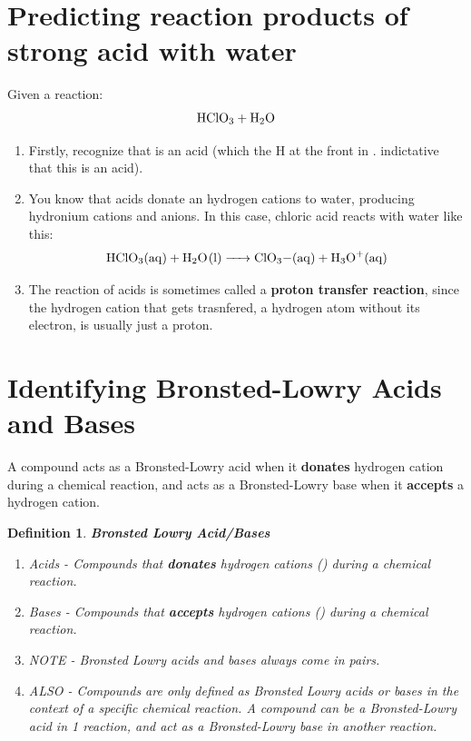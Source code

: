 \documentclass{article}  %
\newtheorem{defn}{Definition}
\begin{document}
\section*{Predicting reaction products of strong acid with water}   
Given a reaction:
\begin{equation*}
    \begin{aligned}
        \ce{HClO3 + H2O}
    \end{aligned}
\end{equation*}
\begin{enumerate}
    \item Firstly, recognize that  is an acid (which the H at the front in . indictative that this is an acid).
    \item You know that acids donate an hydrogen cations to water, producing hydronium cations  and anions. In this case, chloric acid reacts with water like this:
    \begin{equation*}
        \begin{aligned}
            \ce{HClO3_(aq) + H2O_(l) -> ClO3-_(aq) + H3O+_(aq)} 
        \end{aligned}
    \end{equation*}
    \item The reaction of acids is sometimes called a \textbf{proton transfer reaction}, since the hydrogen cation that gets trasnfered, a hydrogen atom without its electron, is usually just a proton.

\end{enumerate}

\section*{Identifying Bronsted-Lowry Acids and Bases}
A compound acts as a Bronsted-Lowry acid when it \textbf{donates} hydrogen cation during a chemical reaction, and acts as a Bronsted-Lowry base when it \textbf{accepts} a hydrogen cation.
\begin{defn}
    \textbf{Bronsted Lowry Acid/Bases} \\
    \begin{enumerate}
        \item Acids - Compounds that \textbf{donates} hydrogen cations () during a chemical reaction.
        \item Bases - Compounds that \textbf{accepts} hydrogen cations () during a chemical reaction.
        \item NOTE - Bronsted Lowry acids and bases always come in pairs.
        \item ALSO - Compounds are only defined as Bronsted Lowry acids or bases in the context of a specific chemical reaction. A compound can be a Bronsted-Lowry acid in 1 reaction, and act as a Bronsted-Lowry base in another reaction.
    \end{enumerate}
    
\end{defn} 
\end{document}
